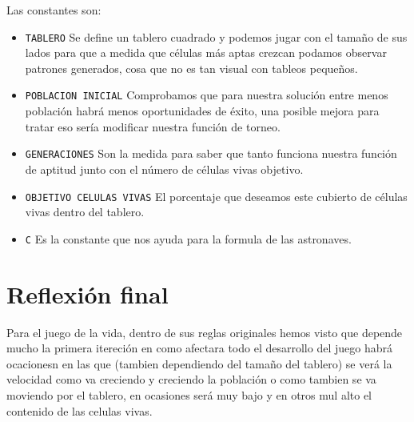 Las constantes son:
\begin{itemize}
    \item \texttt{TABLERO} Se define un tablero cuadrado y podemos jugar con el tamaño
    de sus lados para que a medida que células más aptas crezcan podamos observar patrones
    generados, cosa que no es tan visual con tableos pequeños.

    \item \texttt{POBLACION INICIAL} Comprobamos que para nuestra solución entre menos 
    población habrá menos oportunidades de éxito, una posible mejora para tratar eso sería 
    modificar nuestra función de torneo. 

    \item \texttt{GENERACIONES} Son la medida para saber que tanto funciona nuestra función 
    de aptitud junto con el número de células vivas objetivo. 

    \item \texttt{OBJETIVO CELULAS VIVAS} El porcentaje que deseamos este cubierto de células 
    vivas dentro del tablero.

    \item \texttt{C} Es la constante que nos ayuda para la formula de las astronaves.   
\end{itemize}

\section{Reflexión final}

Para el juego de la vida, dentro de sus reglas originales hemos visto que depende mucho la 
primera itereción en como afectara todo el desarrollo del juego habrá ocacionesn en las que 
(tambien dependiendo del tamaño del tablero) se verá la velocidad como va creciendo y 
creciendo la población o como tambien se va moviendo por el tablero, en ocasiones será muy 
bajo y en otros mul alto el contenido de las celulas vivas. \\



